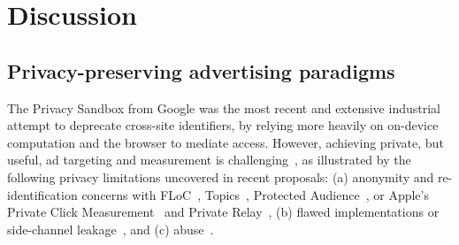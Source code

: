 \section{Discussion}%
\label{sec:future-outlook}

\subsection{Privacy-preserving advertising paradigms}
%
The Privacy Sandbox from Google was the most recent and extensive industrial attempt to deprecate cross-site identifiers, by relying more heavily on on-device computation and the browser to mediate access.
%
However, achieving private, but useful, ad targeting and measurement is challenging~\cite{hoganMakingSensePrivate2026}, as illustrated by the following privacy limitations uncovered in recent proposals: (a) anonymity and re-identification concerns
with FLoC~\cite{rescorlaTechnicalCommentsFLoC2021,berkePrivacyLimitationsInterestbased2022}, Topics~\cite{thomsonPrivacyAnalysisGoogles2023,jhaRobustnessTopicsAPI2023,beuginInterestdisclosingMechanismsAdvertising2024,beuginPublicReproducibleAssessment2024}, Protected Audience~\cite{thomsonProtectedAudiencePrivacy2024,longEvaluatingGooglesProtected2024}, or Apple's Private Click Measurement~\cite{thomsonAnalysisApplesPrivate2022} and Private Relay~\cite{zohaibInvestigatingTrafficAnalysis2023},
(b) flawed implementations or side-channel leakage~\cite{turatiLocalitySensitiveHashingDoes2023,aliNavigatingMurkyWaters2023,calderonioFledgingWillContinue2024,nisenoffExploitingSharedStorage2025}, and (c)  abuse~\cite{senolUnveilingImpactUserAgent2023,wieflingPrivacyMeasureTurned2024}.
%
%
%

